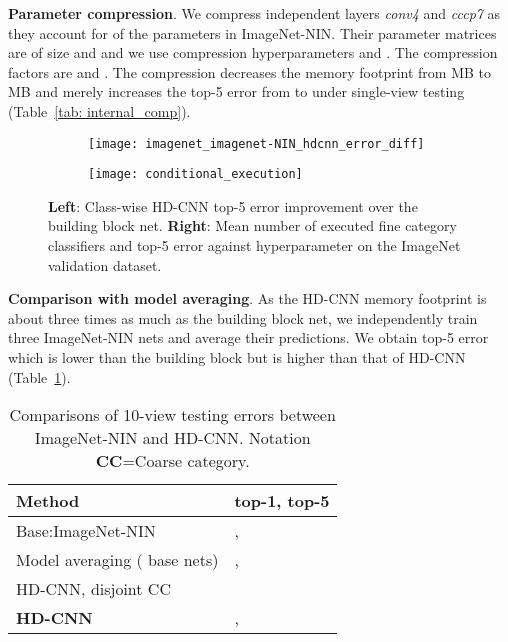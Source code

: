 \documentclass[10pt,twocolumn,letterpaper]{article}
\begin{document}
\noindent \textbf{Parameter compression}. We compress independent layers \textit{conv4} and \textit{cccp7} as they account for  of the parameters in ImageNet-NIN. Their parameter matrices are of size  and  and we use compression hyperparameters  and . The compression factors are  and . The compression decreases the memory footprint from MB to MB and merely increases the top-5 error from  to  under single-view testing (Table~\ref{tab: internal_comp}).

\begin{figure}[h]
\vspace{-0.5em}
\centering
\begin{subfigure}{.23\textwidth}
  \centering
  \texttt{[image: imagenet\_imagenet-NIN\_hdcnn\_error\_diff]}
\end{subfigure}\begin{subfigure}{.27\textwidth}
  \centering
  \texttt{[image: conditional\_execution]}
\end{subfigure}
\caption{\textbf{Left}: Class-wise HD-CNN top-5 error improvement over the building block net. \textbf{Right}: Mean number of executed fine category classifiers and top-5 error against hyperparameter  on the ImageNet validation dataset.}
\vspace{-1em}
\label{fig:coarse_category_nin_imagenet_conditional_exe}
\end{figure}

\noindent \textbf{Comparison with model averaging}. As the HD-CNN memory footprint is about three times as much as the building block net, we independently train three ImageNet-NIN nets and average their predictions. We obtain top-5 error  which is  lower than the building block but is  higher than that of HD-CNN (Table~\ref{tab: imagenet_accuracy_imagenet_nin}).

{\renewcommand{\arraystretch}{1.2}\begin{table}[t]
\vspace{-1.0em}
\caption{Comparisons of 10-view testing errors between ImageNet-NIN and HD-CNN. Notation \textbf{CC}=Coarse category.}
\vspace{-1.5em}
\label{tab: imagenet_accuracy_imagenet_nin} 
\begin{center}
    \begin{tabular}{ p{4.3cm} |p{2.8cm}}
    Method & top-1, top-5 \\
    \hline\hline
    Base:ImageNet-NIN & ,  \\ \hline
    Model averaging ( base nets) &  ,  \\ \hline  
	HD-CNN, disjoint CC &    \\ \hline      
    \textbf{HD-CNN} &  ,  \\ \hline    
    \end{tabular}   
\end{center}
\vspace{-1.5em}
\end{table}
}
\end{document}
